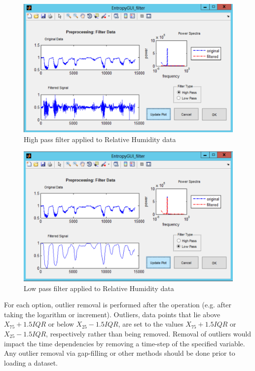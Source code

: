 \documentclass[a4paper]{article}
\begin{document}
\begin{description}
\begin{figure}[h!]\label{fig:filterhp}
\begin{center}
\includegraphics[scale=.5]{Image_FilterRH_hp.pdf}
\caption{High pass filter applied to Relative Humidity data}
\end{center}
\end{figure}


\begin{figure}[h!]\label{fig:filterlp}
\begin{center}
\includegraphics[scale=.5]{Image_FilterRH_lp.pdf}
\caption{Low pass filter applied to Relative Humidity data}
\end{center}
\end{figure}



\end{description}

For each option, outlier removal is performed after the operation (e.g. after taking the logarithm or increment).  Outliers, data points that lie above $X_{75} +1.5IQR$ or below $X_{25}-1.5IQR$, are set to the values $X_{75} +1.5IQR$ or $X_{25}-1.5IQR$, respectively rather than being removed.  Removal of outliers would impact the time dependencies by removing a time-step of the specified variable.  Any outlier removal via gap-filling or other methods should be done prior to loading a dataset.
\end{document}
